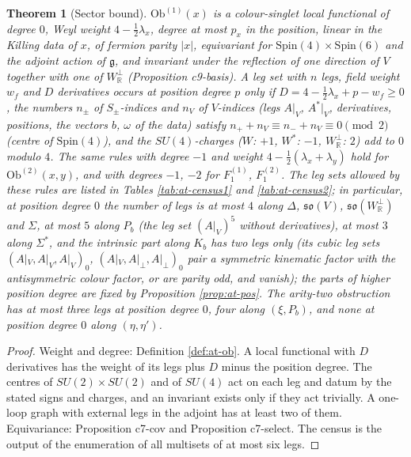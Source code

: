 \documentclass[11pt]{article}
\numberwithin{equation}{section}
\theoremstyle{plain}
\newtheorem{theorem}{Theorem}[section]
\theoremstyle{definition}
\newcommand{\Ap}{A|_{\perp}}
\newcommand{\AV}{A|_V}
\newcommand{\Ob}{\mathrm{Ob}}
\begin{document}
\begin{theorem}[Sector bound]
\label{thm:at-bound}
$\Ob^{(1)}(x)$ is a colour-singlet local functional of degree $0$, Weyl weight $4-\tfrac12\lambda_x$, degree at most $p_x$ in the position, linear in the Killing data of $x$, of fermion parity $|x|$, equivariant for $\mathrm{Spin}(4)\times\mathrm{Spin}(6)$ and the adjoint action of $\mathfrak g$, and invariant under the reflection of one direction of $V$ together with one of $W^\perp_{\mathbb R}$ (Proposition c9-basis). A leg set with $n$ legs, field weight $w_f$ and $D$ derivatives occurs at position degree $p$ only if $D=4-\tfrac12\lambda_x+p-w_f\ge0$, the numbers $n_\pm$ of $S_\pm$-indices and $n_V$ of $V$-indices (legs $A|_V$, $A^*|_V$, derivatives, positions, the vectors $b$, $\omega$ of the data) satisfy $n_++n_V\equiv n_-+n_V\equiv0\pmod 2$ (centre of $\mathrm{Spin}(4)$), and the $SU(4)$-charges ($W$: $+1$, $W^*$: $-1$, $W^\perp_{\mathbb R}$: $2$) add to $0$ modulo $4$. The same rules with degree $-1$ and weight $4-\tfrac12(\lambda_x+\lambda_y)$ hold for $\Ob^{(2)}(x,y)$, and with degrees $-1$, $-2$ for $F_1^{(1)}$, $F_1^{(2)}$. The leg sets allowed by these rules are listed in Tables \ref{tab:at-census1} and \ref{tab:at-census2}; in particular, at position degree $0$ the number of legs is at most $4$ along $\Delta$, $\mathfrak{so}(V)$, $\mathfrak{so}(W^\perp_{\mathbb R})$ and $\Sigma$, at most $5$ along $P_b$ (the leg set $(\AV)^5$ without derivatives), at most $3$ along $\Sigma^*$, and the intrinsic part along $K_b$ has two legs only (its cubic leg sets $(\AV,\AV,\AV)_0$, $(\AV,\Ap,\Ap)_0$ pair a symmetric kinematic factor with the antisymmetric colour factor, or are parity odd, and vanish); the parts of higher position degree are fixed by Proposition \ref{prop:at-pos}. The arity-two obstruction has at most three legs at position degree $0$, four along $(\xi,P_b)$, and none at position degree $0$ along $(\eta,\eta')$.
\end{theorem}

\begin{proof}
Weight and degree: Definition \ref{def:at-ob}. A local functional with $D$ derivatives has the weight of its legs plus $D$ minus the position degree. The centres of $SU(2)\times SU(2)$ and of $SU(4)$ act on each leg and datum by the stated signs and charges, and an invariant exists only if they act trivially. A one-loop graph with external legs in the adjoint has at least two of them. Equivariance: Proposition c7-cov and Proposition c7-select. The census is the output of the enumeration of all multisets of at most six legs.
\end{proof}
\end{document}
